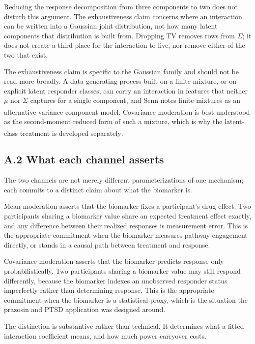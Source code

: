 \documentclass[
  11pt,
]{article}
\begin{document}
Reducing the response decomposition from three components to two does
not disturb this argument. The exhaustiveness claim concerns where an
interaction can be written into a Gaussian joint distribution, not
how many latent components that distribution is built from. Dropping
TV removes rows from \(\Sigma\); it does not create a third place for
the interaction to live, nor remove either of the two that exist.

The exhaustiveness claim is specific to the Gaussian family and
should not be read more broadly. A data-generating process built on a
finite mixture, or on explicit latent responder classes, can carry an
interaction in features that neither \(\mu\) nor \(\Sigma\) captures for
a single component, and Senn notes finite mixtures as an alternative
variance-component model\textsuperscript{}. Covariance moderation
is best understood as the second-moment reduced form of such a
mixture, which is why the latent-class treatment is developed
separately\textsuperscript{}.

\subsection{A.2 What each channel asserts}

The two channels are not merely different parameterizations of one
mechanism; each commits to a distinct claim about what the biomarker
is.

Mean moderation asserts that the biomarker fixes a participant's drug
effect. Two participants sharing a biomarker value share an expected
treatment effect exactly, and any difference between their realized
responses is measurement error. This is the appropriate commitment
when the biomarker measures pathway engagement directly, or stands in
a causal path between treatment and response.

Covariance moderation asserts that the biomarker predicts response
only probabilistically. Two participants sharing a biomarker value
may still respond differently, because the biomarker indexes an
unobserved responder status imperfectly rather than determining
response. This is the appropriate commitment when the biomarker is a
statistical proxy, which is the situation the prazosin and PTSD
application was designed around.

The distinction is substantive rather than technical. It determines
what a fitted interaction coefficient means, and how much power
carryover costs.
\end{document}
